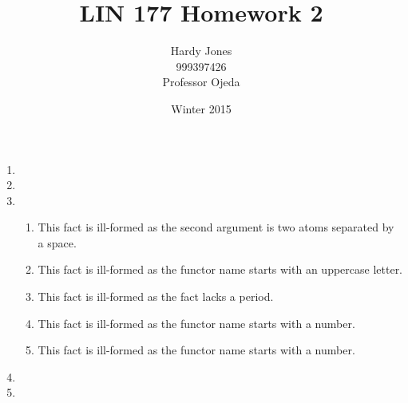 \documentclass[12pt,letterpaper]{article}
\title{LIN 177 Homework 2\vspace{-2ex}}
\author{Hardy Jones\\
        999397426\\
        Professor Ojeda\vspace{-2ex}}
\date{Winter 2015}
\begin{document}
  \maketitle


  \begin{enumerate}
    \item
    \item
    \item
      \begin{enumerate}
        \item This fact is ill-formed as the second argument is two atoms separated by a space.
        \item This fact is ill-formed as the functor name starts with an uppercase letter.
        \item This fact is ill-formed as the fact lacks a period.
        \item This fact is ill-formed as the functor name starts with a number.
        \item This fact is ill-formed as the functor name starts with a number.
      \end{enumerate}
    \item
    \item
  \end{enumerate}
\end{document}
